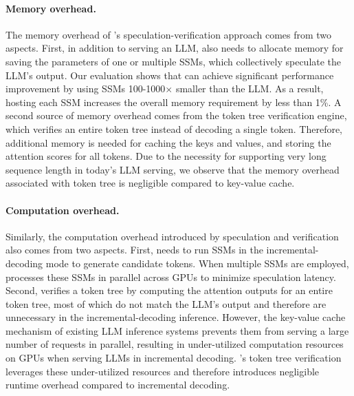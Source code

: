 \paragraph{Memory overhead.} The memory overhead of \Sys's speculation-verification approach comes from two aspects. First, in addition to serving an LLM, \Sys also needs to allocate memory for saving the parameters of one or multiple SSMs, which collectively speculate the LLM's output. 
Our evaluation shows that \Sys can achieve significant performance improvement by using SSMs 100-1000$\times$ smaller than the LLM. As a result, hosting each SSM increases the overall memory requirement by less than 1\%. 
A second source of memory overhead comes from the token tree verification engine, which verifies an entire token tree instead of decoding a single token. 
Therefore, additional memory is needed for caching the keys and values, and storing the attention scores for all tokens. 
Due to the necessity for supporting very long sequence length in today's LLM serving, we observe that the memory overhead associated with token tree is negligible compared to key-value cache.

\paragraph{Computation overhead.} Similarly, the computation overhead introduced by speculation and verification also comes from two aspects.
First, \Sys needs to run SSMs in the incremental-decoding mode to generate candidate tokens. When multiple SSMs are employed, \sys processes these SSMs in parallel across GPUs to minimize speculation latency.
Second, \Sys verifies a token tree by computing the attention outputs for an entire token tree, most of which do not match the LLM's output and therefore are unnecessary in the incremental-decoding inference.
However, the key-value cache mechanism of existing LLM inference systems prevents them from serving a large number of requests in parallel, resulting in under-utilized computation resources on GPUs when serving LLMs in incremental decoding. \Sys's token tree verification leverages these under-utilized resources and therefore introduces negligible runtime overhead compared to incremental decoding.

